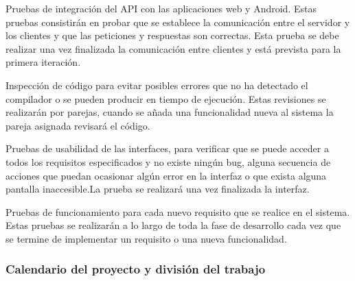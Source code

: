 \documentclass{article}
\begin{document}
Pruebas de integración del API con las aplicaciones web y Android. Estas pruebas consistirán en probar que se establece la comunicación entre el servidor y los clientes y que las peticiones y respuestas son correctas. Esta prueba se debe realizar una vez finalizada la comunicación entre clientes y está prevista para la primera iteración.

Inspección de código para evitar posibles errores que no ha detectado el compilador o se pueden producir en tiempo de ejecución. Estas revisiones se realizarán por parejas, cuando se añada una funcionalidad nueva al sistema la pareja asignada revisará el código.

Pruebas de usabilidad de las interfaces, para verificar que se puede acceder a todos los requisitos especificados y no existe ningún bug, alguna secuencia de acciones que puedan ocasionar algún error en la interfaz o que exista alguna pantalla inaccesible.La prueba se realizará una vez finalizada la interfaz.

Pruebas de funcionamiento para cada nuevo requisito que se realice en el sistema. Estas pruebas se realizarán a lo largo de toda la fase de desarrollo cada vez que se termine de implementar un requisito o una nueva funcionalidad.

\subsubsection{Calendario del proyecto y división del trabajo}

\end{document}
